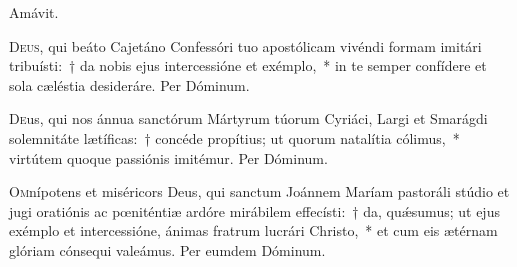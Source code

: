 \documentclass[vesperale_romanum.tex]{subfiles}
\begin{document}

\omniapraeter



\myrule


\duplex



\vv Amávit.

\oratio

\lettrine{D}{eus}, qui beáto Cajetáno Confessóri tuo apostólicam vivéndi formam imitári tribuísti:~† da nobis ejus intercessióne et exémplo,~* in te semper confídere et sola cæléstia desideráre. Per Dóminum.



\commemoration

\myrule



\oratio

\lettrine{D}{e}us, qui nos ánnua san\-ctórum Mártyrum túorum Cyriáci, Largi et Smarágdi solemnitáte lætíficas:~† concéde propítius; ut quorum natalítia cólimus,~*  virtútem quoque passiónis
imitémur. Per Dóminum.


\myrule

\duplexmtv

\oratio

\lettrine{O}{m}nípotens et miséricors Deus, qui san\-ctum Joánnem Maríam pastoráli stúdio et jugi oratiónis ac pœniténtiæ ardóre mirábilem effecísti:~† da, quǽsumus; ut ejus exémplo et intercessióne, ánimas fratrum lucrári Christo,~* et cum eis ætérnam glóriam cónsequi valeámus. Per eumdem Dóminum.

\end{document}
